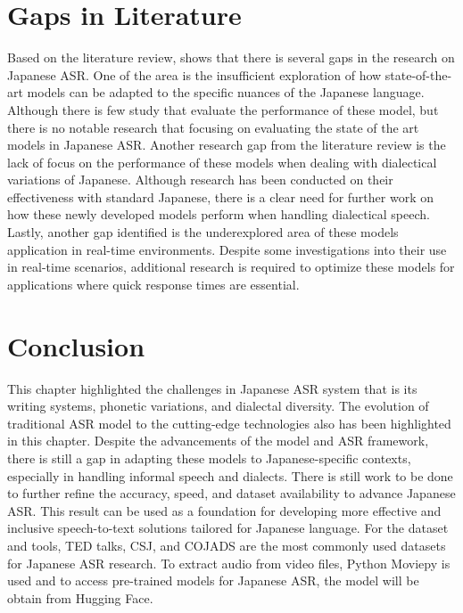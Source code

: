 \section{Gaps in Literature}
Based on the literature review, shows that there is several gaps in the research on Japanese ASR. One of the area is the insufficient exploration of how state-of-the-art models can be adapted to the specific nuances of the Japanese language. Although there is few study that evaluate the performance of these model, but there is no notable research that focusing on evaluating the state of the art models in Japanese ASR. Another research gap from the literature review is the lack of focus on the performance of these models when dealing with dialectical variations of Japanese. Although research has been conducted on their effectiveness with standard Japanese, there is a clear need for further work on how these newly developed models perform when handling dialectical speech. Lastly, another gap identified is the underexplored area of these models application in real-time environments. Despite some investigations into their use in real-time scenarios, additional research is required to optimize these models for applications where quick response times are essential.

\section{Conclusion}
This chapter highlighted the challenges in Japanese ASR system that is its writing systems, phonetic variations, and dialectal diversity. The evolution of traditional ASR model to the cutting-edge technologies also has been highlighted in this chapter. Despite the advancements of the model and ASR framework, there is still a gap in adapting these models to Japanese-specific contexts, especially in handling informal speech and dialects. There is still work to be done to further refine the accuracy, speed, and dataset availability to advance Japanese ASR. This result can be used as a foundation for developing more effective and inclusive speech-to-text solutions tailored for Japanese language. For the dataset and tools, TED talks, CSJ, and COJADS are the most commonly used datasets for Japanese ASR research. To extract audio from video files, Python Moviepy is used and to access pre-trained models for Japanese ASR, the model will be obtain from Hugging Face. 